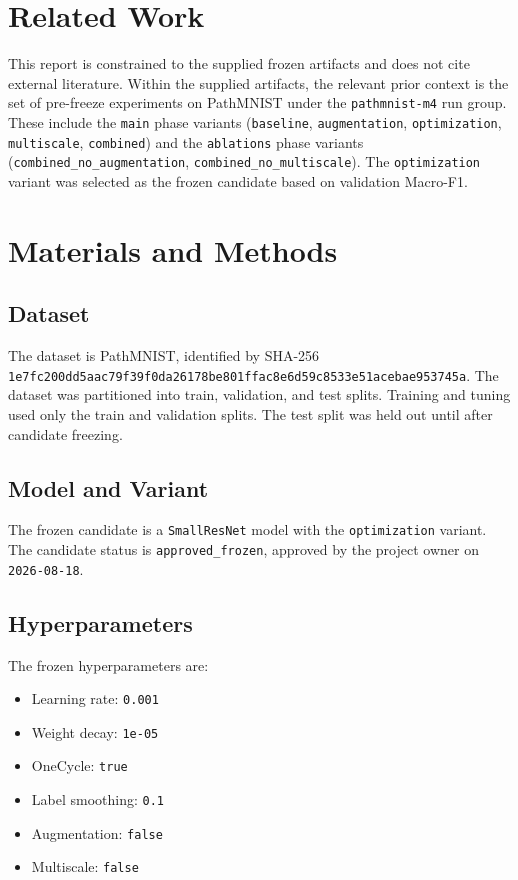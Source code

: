 \documentclass[10pt]{article}
\begin{document}
\section{Related Work}
This report is constrained to the supplied frozen artifacts and does not cite external literature. Within the supplied artifacts, the relevant prior context is the set of pre-freeze experiments on PathMNIST under the \texttt{pathmnist-m4} run group. These include the \texttt{main} phase variants (\texttt{baseline}, \texttt{augmentation}, \texttt{optimization}, \texttt{multiscale}, \texttt{combined}) and the \texttt{ablations} phase variants (\texttt{combined\_no\_augmentation}, \texttt{combined\_no\_multiscale}). The \texttt{optimization} variant was selected as the frozen candidate based on validation Macro-F1.
\section{Materials and Methods}
\subsection{Dataset}
The dataset is PathMNIST, identified by SHA-256 \texttt{1e7fc200dd5aac79f39f0da26178be801ffac8e6d59c8533e51acebae953745a}. The dataset was partitioned into train, validation, and test splits. Training and tuning used only the train and validation splits. The test split was held out until after candidate freezing.
\subsection{Model and Variant}
The frozen candidate is a \texttt{SmallResNet} model with the \texttt{optimization} variant. The candidate status is \texttt{approved\_frozen}, approved by the project owner on \texttt{2026-08-18}.
\subsection{Hyperparameters}
The frozen hyperparameters are:
\begin{itemize}
\item Learning rate: \texttt{0.001}
\item Weight decay: \texttt{1e-05}
\item OneCycle: \texttt{true}
\item Label smoothing: \texttt{0.1}
\item Augmentation: \texttt{false}
\item Multiscale: \texttt{false}
\end{itemize}
\end{document}
